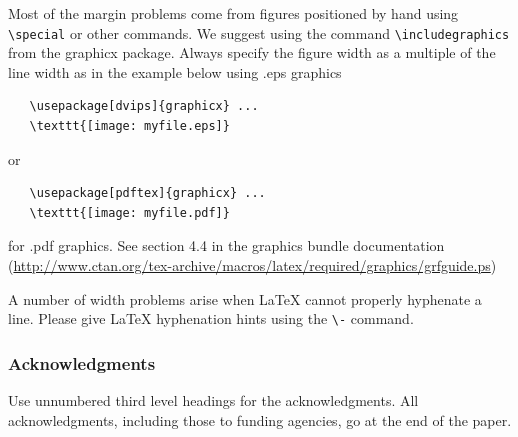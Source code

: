 \documentclass{article} %
\begin{document}
Most of the margin problems come from figures positioned by hand using
\verb+\special+ or other commands. We suggest using the command
\verb+\includegraphics+
from the graphicx package. Always specify the figure width as a multiple of
the line width as in the example below using .eps graphics
\begin{verbatim}
   \usepackage[dvips]{graphicx} ...
   \texttt{[image: myfile.eps]}
\end{verbatim}
or %
\begin{verbatim}
   \usepackage[pdftex]{graphicx} ...
   \texttt{[image: myfile.pdf]}
\end{verbatim}
for .pdf graphics.
See section 4.4 in the graphics bundle documentation (\url{http://www.ctan.org/tex-archive/macros/latex/required/graphics/grfguide.ps})

A number of width problems arise when LaTeX cannot properly hyphenate a
line. Please give LaTeX hyphenation hints using the \verb+\-+ command.


\subsubsection*{Acknowledgments}

Use unnumbered third level headings for the acknowledgments. All
acknowledgments, including those to funding agencies, go at the end of the paper.



\end{document}
